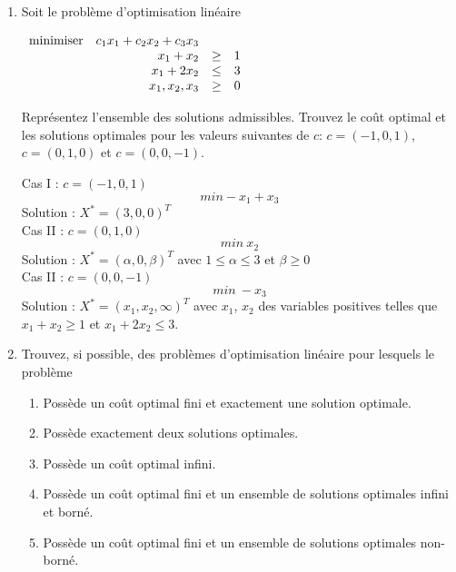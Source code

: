 \begin{enumerate}
  \item Soit le problème d'optimisation linéaire

    $
    \begin{array}{lrcr}
      \mbox{minimiser} & c_1 x_1 + c_2 x_2 + c_3 x_3\\
      & x_1 + x_2 & \geq & 1\\
      & x_1 + 2x_2 & \leq & 3\\
      & x_1, x_2, x_3 & \geq & 0
    \end{array}
    $

    Représentez l'ensemble des solutions admissibles. Trouvez le coût optimal et les solutions  optimales pour les
    valeurs suivantes de $c$: $c=(-1, 0, 1)$,
    $c=(0, 1, 0)$ et
    $c=(0, 0, -1)$.

    \begin{solution}
      Cas I : $c = (-1,0,1)$ \\
      $$ min -x_{1} + x_{3}$$
      Solution : $X^{*} = (3,0,0)^{T}$\\
      \newline
      Cas II : $c = (0,1,0)$ \\
      $$ min~x_{2}$$
      Solution : $X^{*} = (\alpha,0,\beta)^{T}$ avec $ 1\le \alpha \le 3$ et $\beta \geq 0$\\
      \newline
      Cas II : $c = (0,0,-1)$ \\
      $$ min~-x_{3}$$
      Solution : $X^{*} = (x_{1},x_{2},\infty)^{T}$ avec $x_{1}$, $x_{2}$ des variables positives telles que $x_{1} + x_{2} \geq 1$ et $x_{1} + 2x_{2} \le 3$. 

    \end{solution}


  \item  Trouvez, si possible, des problèmes d'optimisation linéaire pour lesquels le problème

    \begin{enumerate}
      \item Poss\`ede un co\^ut optimal fini et exactement une solution optimale.
      \item Poss\`ede exactement deux solutions optimales.
      \item Possède un coût optimal infini.
      \item Possède un coût optimal fini et un ensemble de solutions optimales infini et borné.
      \item Possède un coût optimal fini et un ensemble de solutions  optimales non-borné.


\end{enumerate}
\end{enumerate}
